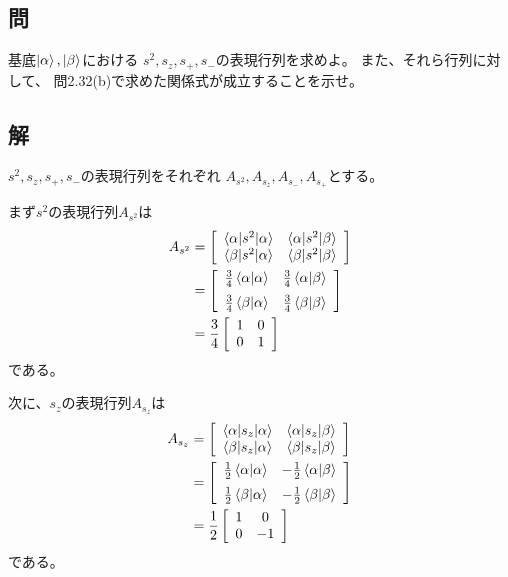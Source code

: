 \subsection{問}
基底$\ket{\alpha},\ket{\beta}$における
$s^2,s_z,s_+,s_-$の表現行列を求めよ。
また、それら行列に対して、
問2.32(b)で求めた関係式が成立することを示せ。

\subsection{解}
$s^2,s_z,s_+,s_-$の表現行列をそれぞれ
$A_{s^2}, A_{s_z}, A_{s_-}, A_{s_+}$とする。

まず$s^2$の表現行列$A_{s^2}$は
\begin{align}
	A_{s^2}
&=
	\left[
	\begin{array}{cc}
		\braket{\alpha|s^2|\alpha} &
		\braket{\alpha|s^2|\beta} \\
		\braket{\beta|s^2|\alpha} &
		\braket{\beta|s^2|\beta}
	\end{array}
	\right] \\
%
%
&=
	\left[
	\begin{array}{cc}
		\frac{3}{4}\braket{\alpha|\alpha} &
		\frac{3}{4}\braket{\alpha|\beta} \\[2mm]
		\frac{3}{4}\braket{\beta|\alpha} &
		\frac{3}{4}\braket{\beta|\beta}
	\end{array}
	\right] \\
%
%
&=
	\frac{3}{4}
	\left[
	\begin{array}{cc}
		1 & 0 \\
		0 & 1
	\end{array}
	\right]
\end{align}
である。


次に、$s_z$の表現行列$A_{s_z}$は
\begin{align}
	A_{s_z}
&=
	\left[
	\begin{array}{cc}
		\braket{\alpha|s_z|\alpha} &
		\braket{\alpha|s_z|\beta} \\
		\braket{\beta|s_z|\alpha} &
		\braket{\beta|s_z|\beta}
	\end{array}
	\right] \\
%
%
&=
	\left[
	\begin{array}{cc}
		\frac{1}{2} \braket{\alpha|\alpha} &
		-\frac{1}{2} \braket{\alpha|\beta} \\[2mm]
		\frac{1}{2} \braket{\beta|\alpha} &
		-\frac{1}{2} \braket{\beta|\beta}
	\end{array}
	\right] \\
%
%
&=
	\frac{1}{2}
	\left[
	\begin{array}{cc}
		1 & 0 \\
		0 & -1
	\end{array}
	\right]
\end{align}
である。



